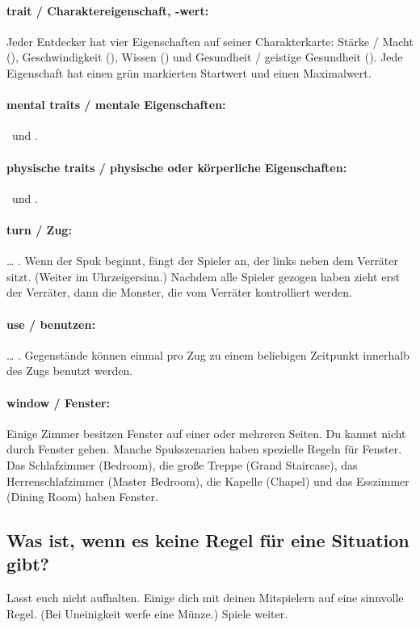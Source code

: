 \paragraph{trait / Charaktereigenschaft, -wert:} Jeder Entdecker hat vier Eigenschaften auf seiner Charakterkarte: Stärke / Macht (\might), Geschwindigkeit (\speed), Wissen (\know) und Gesundheit / geistige Gesundheit (\sanity). Jede Eigenschaft hat einen grün markierten Startwert und einen Maximalwert.

\paragraph{mental traits / mentale Eigenschaften:} \sanity\ und \know.
\paragraph{physische traits / physische oder körperliche Eigenschaften:} \speed\ und \might.

\paragraph{turn / Zug:} … . Wenn der Spuk beginnt, fängt der Spieler an, der links neben dem Verräter sitzt. (Weiter im Uhrzeigersinn.) Nachdem alle Spieler gezogen haben zieht erst der Verräter, dann die Monster, die vom Verräter kontrolliert werden.

\paragraph{use / benutzen:} … . Gegenstände können einmal pro Zug zu einem beliebigen Zeitpunkt innerhalb des Zugs benutzt werden.

\paragraph{window / Fenster:} Einige Zimmer besitzen Fenster auf einer oder mehreren Seiten. Du kannst nicht durch Fenster gehen. Manche Spukszenarien haben spezielle Regeln für Fenster. Das Schlafzimmer (Bedroom), die große Treppe (Grand Staircase), das Herrenschlafzimmer (Master Bedroom), die Kapelle (Chapel) und das Esszimmer (Dining Room) haben Fenster.

\subsection{Was ist, wenn es keine Regel für eine Situation gibt?}

Lasst euch nicht aufhalten. Einige dich mit deinen Mitspielern auf eine sinnvolle Regel. (Bei Uneinigkeit werfe eine Münze.) Spiele weiter.